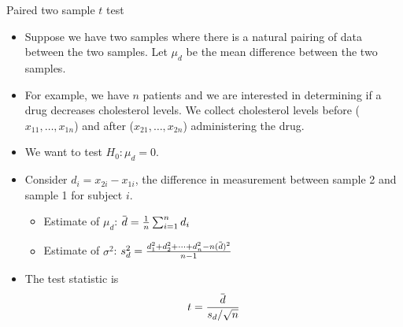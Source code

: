 \documentclass[10pt, handout, xcolor=table]{beamer}
\newcommand*\themecol{\usebeamercolor[fg]{structure}}
\newcommand{\overbar}[1]{\mkern 1.5mu\overline{\mkern-1.5mu#1\mkern-1.5mu}\mkern 1.5mu}
\begin{document}
\begin{frame}{Paired two sample $t$ test}
\begin{itemize}\itemsep2ex
\item Suppose we have two samples where there is a natural pairing of data between the two samples. Let $\mu_d$ be the mean difference between the two samples. 
\item For example, we have $n$ patients and we are interested in determining if a drug decreases cholesterol levels. We collect cholesterol levels before ($x_{11}, \ldots, x_{1n}$) and after ($x_{21}, \ldots, x_{2n}$) administering the drug. 
\item We want to test $H_0: \mu_d = 0$.
\item Consider $d_i = x_{2i} - x_{1i}$, the difference in measurement between sample 2 and sample 1 for subject $i$.
\begin{itemize}
\item Estimate of $\mu_d$: $\overbar{d} = \frac{1}{n} \sum_{i=1}^n d_i$
\item Estimate of $\sigma^2$: $s^2_d = \frac{d_1^2 + d_2^2 + \cdots + d_n^2 - n(\overbar{d})^2}{n-1}$
\end{itemize}
\item The test statistic is
{\themecol
\[
t = \frac{\overbar{d}}{s_d/\sqrt{n}}
\]
}
\end{itemize}
\end{frame}
\end{document}
